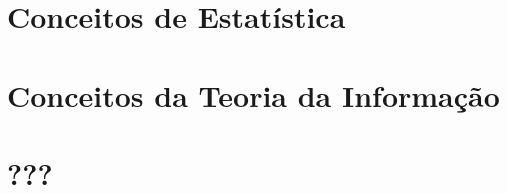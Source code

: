 \documentclass[a4paper,12pt,oneside,openany]{book}
\begin{document}
\normalsize
\cleardoublepage
{}



   \appendix
   \chapter{Conceitos de Estatística}
   \label{ApendiceA}
   
   \chapter{Conceitos da Teoria da Informação}
   \label{ApendiceB}
   
   \chapter{???}
   \label{ApendiceC}
      

\backmatter
\end{document}
